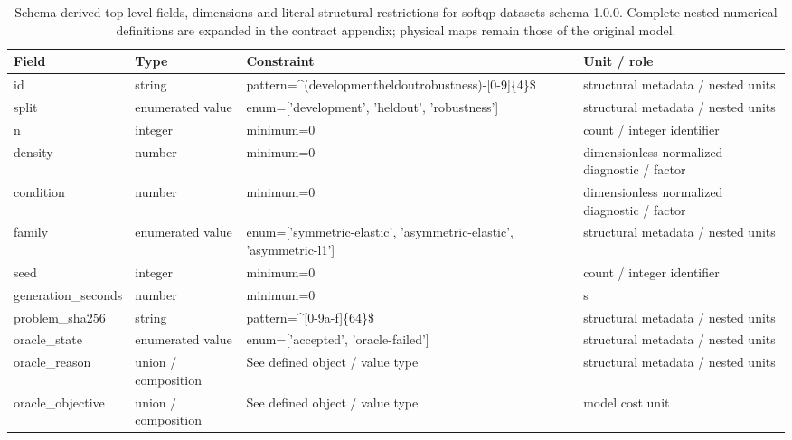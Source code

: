 \begin{table}[htbp]\centering\footnotesize
\caption{Schema-derived top-level fields, dimensions and literal structural restrictions for softqp-datasets schema 1.0.0. Complete nested numerical definitions are expanded in the contract appendix; physical maps remain those of the original model.}\label{tab:contract-softqp-datasets}
\begin{tabularx}{\textwidth}{@{}>{\raggedright\arraybackslash}p{}>{\raggedright\arraybackslash}p{}>{\raggedright\arraybackslash}X>{\raggedright\arraybackslash}X@{}}\toprule
Field & Type & Constraint & Unit / role\\\midrule
id & string & pattern=\allowbreak{}\textasciicircum{}(development\textbar{}\allowbreak{}heldout\textbar{}\allowbreak{}robustness)-[0-9]\{4\}\$ & structural metadata /\allowbreak{} nested units\\
split & enumerated value & enum=\allowbreak{}['development', 'heldout', 'robustness'] & structural metadata /\allowbreak{} nested units\\
n & integer & minimum=\allowbreak{}0 & count /\allowbreak{} integer identifier\\
density & number & minimum=\allowbreak{}0 & dimensionless normalized diagnostic /\allowbreak{} factor\\
condition & number & minimum=\allowbreak{}0 & dimensionless normalized diagnostic /\allowbreak{} factor\\
family & enumerated value & enum=\allowbreak{}['symmetric-\allowbreak{}elastic', 'asymmetric-\allowbreak{}elastic', 'asymmetric-\allowbreak{}l1'] & structural metadata /\allowbreak{} nested units\\
seed & integer & minimum=\allowbreak{}0 & count /\allowbreak{} integer identifier\\
generation\_\allowbreak{}seconds & number & minimum=\allowbreak{}0 & s\\
problem\_\allowbreak{}sha256 & string & pattern=\allowbreak{}\textasciicircum{}[0-9a-\allowbreak{}f]\{64\}\$ & structural metadata /\allowbreak{} nested units\\
oracle\_\allowbreak{}state & enumerated value & enum=\allowbreak{}['accepted', 'oracle-\allowbreak{}failed'] & structural metadata /\allowbreak{} nested units\\
oracle\_\allowbreak{}reason & union /\allowbreak{} composition & See defined object /\allowbreak{} value type & structural metadata /\allowbreak{} nested units\\
oracle\_\allowbreak{}objective & union /\allowbreak{} composition & See defined object /\allowbreak{} value type & model cost unit\\
\bottomrule\end{tabularx}
\end{table}
